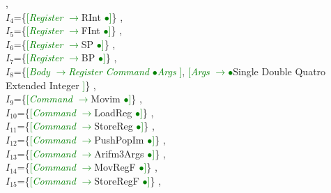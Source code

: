 \documentclass[a0]{a0poster}
\begin{document}
,\\
$I_{4}$=\{\textcolor{Green}{[}\textcolor{Green}{\textit{Register}} \textcolor{Green}{$\to$}RInt \textcolor{Green}{$\bullet$}\textcolor{Green}{]}\}
,\\
$I_{5}$=\{\textcolor{Green}{[}\textcolor{Green}{\textit{Register}} \textcolor{Green}{$\to$}FInt \textcolor{Green}{$\bullet$}\textcolor{Green}{]}\}
,\\
$I_{6}$=\{\textcolor{Green}{[}\textcolor{Green}{\textit{Register}} \textcolor{Green}{$\to$}SP \textcolor{Green}{$\bullet$}\textcolor{Green}{]}\}
,\\
$I_{7}$=\{\textcolor{Green}{[}\textcolor{Green}{\textit{Register}} \textcolor{Green}{$\to$}BP \textcolor{Green}{$\bullet$}\textcolor{Green}{]}\}
,\\
$I_{8}$=\{\textcolor{Green}{[}\textcolor{Green}{\textit{Body}} \textcolor{Green}{$\to$}\textcolor{Green}{\textit{Register}} \textcolor{Green}{\textit{Command}} \textcolor{Green}{$\bullet$}\textcolor{Green}{\textit{Args}} \textcolor{Green}{]}, \textcolor{Green}{[}\textcolor{Green}{\textit{Args}} \textcolor{Green}{$\to$}\textcolor{Green}{$\bullet$}Single Double Quatro Extended Integer \textcolor{Green}{]}\}
,\\
$I_{9}$=\{\textcolor{Green}{[}\textcolor{Green}{\textit{Command}} \textcolor{Green}{$\to$}Movim \textcolor{Green}{$\bullet$}\textcolor{Green}{]}\}
,\\
$I_{10}$=\{\textcolor{Green}{[}\textcolor{Green}{\textit{Command}} \textcolor{Green}{$\to$}LoadReg \textcolor{Green}{$\bullet$}\textcolor{Green}{]}\}
,\\
$I_{11}$=\{\textcolor{Green}{[}\textcolor{Green}{\textit{Command}} \textcolor{Green}{$\to$}StoreReg \textcolor{Green}{$\bullet$}\textcolor{Green}{]}\}
,\\
$I_{12}$=\{\textcolor{Green}{[}\textcolor{Green}{\textit{Command}} \textcolor{Green}{$\to$}PushPopIm \textcolor{Green}{$\bullet$}\textcolor{Green}{]}\}
,\\
$I_{13}$=\{\textcolor{Green}{[}\textcolor{Green}{\textit{Command}} \textcolor{Green}{$\to$}Arifm3Args \textcolor{Green}{$\bullet$}\textcolor{Green}{]}\}
,\\
$I_{14}$=\{\textcolor{Green}{[}\textcolor{Green}{\textit{Command}} \textcolor{Green}{$\to$}MovRegF \textcolor{Green}{$\bullet$}\textcolor{Green}{]}\}
,\\
$I_{15}$=\{\textcolor{Green}{[}\textcolor{Green}{\textit{Command}} \textcolor{Green}{$\to$}StoreRegF \textcolor{Green}{$\bullet$}\textcolor{Green}{]}\}
,\\
\end{document}
